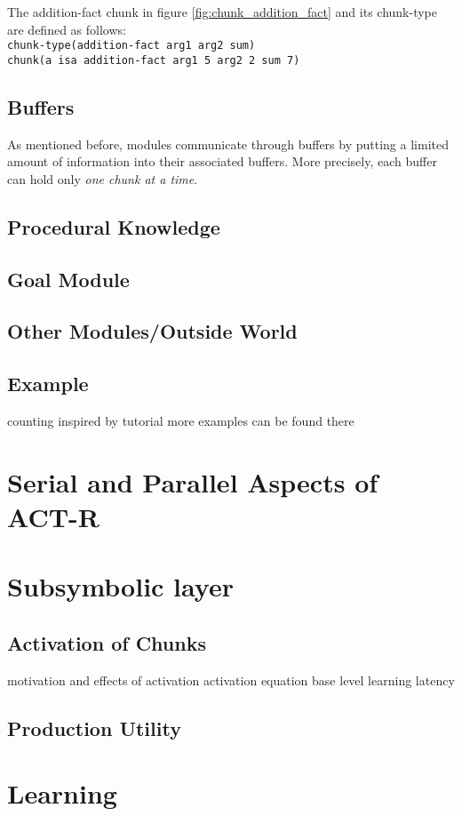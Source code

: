 \begin{example}
 The addition-fact chunk in figure \ref{fig:chunk_addition_fact} and its chunk-type are defined as follows:\\
 \verb|chunk-type(addition-fact arg1 arg2 sum)|\\
 \verb|chunk(a isa addition-fact arg1 5 arg2 2 sum 7)|
\end{example}



\subsection{Buffers}

As mentioned before, modules communicate through buffers by putting a limited amount of information into their associated buffers. More precisely, each buffer can hold only \emph{one chunk at a time}.

\subsection{Procedural Knowledge}



\subsection{Goal Module}

\subsection{Other Modules/Outside World}

\subsection{Example}

counting
inspired by tutorial
more examples can be found there

\section{Serial and Parallel Aspects of ACT-R}

\section{Subsymbolic layer}

\subsection{Activation of Chunks}

motivation and effects of activation
activation equation
base level learning
latency

\subsection{Production Utility}



\section{Learning}
